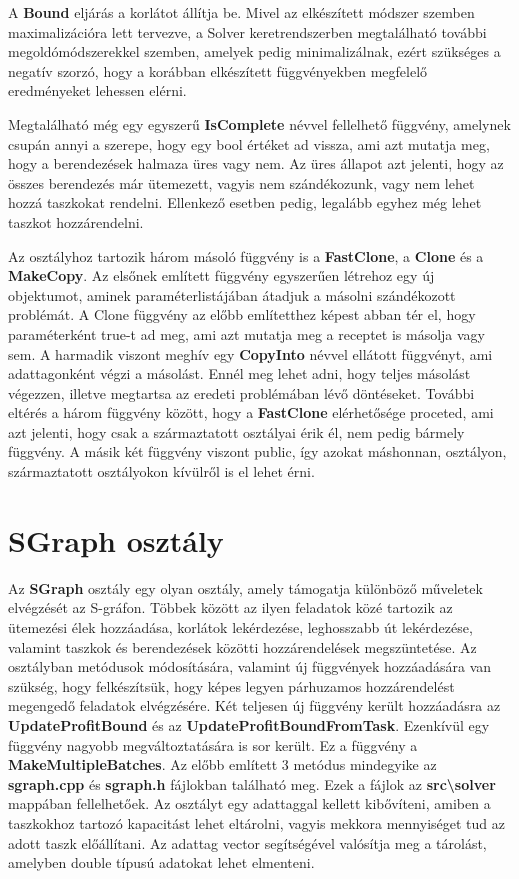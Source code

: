 A \textbf{Bound} eljárás a korlátot állítja be. Mivel az elkészített módszer szemben maximalizációra lett tervezve, a Solver keretrendszerben megtalálható további megoldómódszerekkel szemben, amelyek pedig minimalizálnak, ezért szükséges a negatív szorzó, hogy a korábban elkészített függvényekben megfelelő eredményeket lehessen elérni.

Megtalálható még egy egyszerű \textbf{IsComplete} névvel fellelhető függvény, amelynek csupán annyi a szerepe, hogy egy bool értéket ad vissza, ami azt mutatja meg, hogy a berendezések halmaza üres vagy nem. Az üres állapot azt jelenti, hogy az összes berendezés már ütemezett, vagyis nem szándékozunk, vagy nem lehet hozzá taszkokat rendelni. Ellenkező esetben pedig, legalább egyhez még lehet taszkot hozzárendelni.

Az osztályhoz tartozik három másoló függvény is a \textbf{FastClone}, a \textbf{Clone} és a \textbf{MakeCopy}. Az elsőnek említett függvény egyszerűen létrehoz egy új objektumot, aminek paraméterlistájában átadjuk a másolni szándékozott problémát. A Clone függvény az előbb említetthez képest abban tér el, hogy paraméterként true-t ad meg, ami azt mutatja meg a receptet is másolja vagy sem. A harmadik viszont meghív egy \textbf{CopyInto} névvel ellátott függvényt, ami adattagonként végzi a másolást. Ennél meg lehet adni, hogy teljes másolást végezzen, illetve megtartsa az eredeti problémában lévő döntéseket. További eltérés a három függvény között, hogy a \textbf{FastClone} elérhetősége proceted, ami azt jelenti, hogy csak a származtatott osztályai érik él, nem pedig bármely függvény. A másik két függvény viszont public, így azokat máshonnan, osztályon, származtatott osztályokon kívülről is el lehet érni. 

\section{SGraph osztály}
Az \textbf{SGraph} osztály egy olyan osztály, amely támogatja különböző műveletek elvégzését az S-gráfon. Többek között az ilyen feladatok közé tartozik az ütemezési élek hozzáadása, korlátok lekérdezése, leghosszabb út lekérdezése, valamint taszkok és berendezések közötti hozzárendelések megszüntetése. Az osztályban metódusok módosítására, valamint új függvények hozzáadására van szükség, hogy felkészítsük, hogy képes legyen párhuzamos hozzárendelést megengedő feladatok elvégzésére. Két teljesen új függvény került hozzáadásra az \textbf{UpdateProfitBound} és az \textbf{UpdateProfitBoundFromTask}. Ezenkívül egy függvény nagyobb megváltoztatására is sor került. Ez a függvény a \textbf{MakeMultipleBatches}. Az előbb említett 3 metódus mindegyike az \textbf{sgraph.cpp} és \textbf{sgraph.h} fájlokban található meg. Ezek a fájlok az \textbf{src\textbackslash solver} mappában fellelhetőek. Az osztályt egy adattaggal kellett kibővíteni, amiben a taszkokhoz tartozó kapacitást lehet eltárolni, vagyis mekkora mennyiséget tud az adott taszk előállítani. Az adattag vector segítségével valósítja meg a tárolást, amelyben double típusú adatokat lehet elmenteni.
